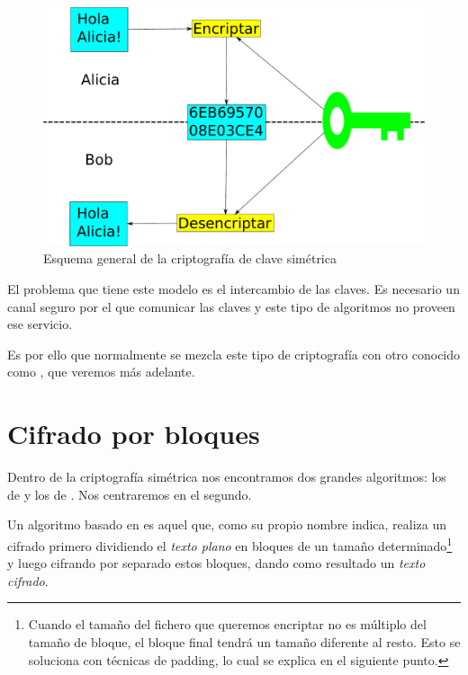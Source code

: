 \begin{figure}[ht]
  \centering
  \includegraphics[scale=0.4]{Figures/SymmetricKeyEncryption}
  \decoRule
  \caption[Criptografía de clave simétrica (Esquema)]{Esquema general de la criptografía de clave simétrica}
  \label{fig:SymmetricKeyEncryption}
\end{figure}

El problema que tiene este modelo es el intercambio de las claves.
Es necesario un canal seguro por el que comunicar las claves y este tipo de algoritmos no proveen ese servicio. \emph{\parencite{Reference19}}

Es por ello que normalmente se mezcla este tipo de criptografía con otro conocido como , que veremos más adelante.


\section{Cifrado por bloques}

Dentro de la criptografía simétrica nos encontramos dos grandes algoritmos: los de  y los de .
Nos centraremos en el segundo.

Un algoritmo basado en  es aquel que, como su propio nombre indica,
realiza un cifrado primero dividiendo el \emph{texto plano} en bloques de un tamaño determinado\footnote{Cuando el tamaño del fichero que queremos encriptar no es múltiplo del tamaño de bloque, el bloque final tendrá un tamaño diferente al resto. Esto se soluciona con técnicas de padding, lo cual se explica en el siguiente punto.}
y luego cifrando por separado estos bloques, dando como resultado un \emph{texto cifrado}.

